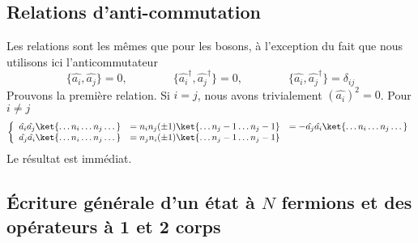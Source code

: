 \subsection{Relations d’anti-commutation}
Les relations sont les mêmes que pour les bosons, à l'exception du fait que nous utilisons ici 
l'anticommutateur
\begin{equation}
\{\hat{a_i},\hat{a_j}\}=0,\qquad\qquad \{\hat{a_i}^\dagger,\hat{a_j}^\dagger\}=0,\qquad\qquad
\{\hat{a_i},\hat{a_j}^\dagger\} = \delta_{ij}
\end{equation}
Prouvons la première relation. Si $i=j$, nous avons trivialement $(\hat{a_i})^2=0$. Pour $i\neq j$
\begin{equation}
\left\{\begin{array}{lll}
\hat{a_i}\hat{a_j}\ket{\dots n_i\dots n_j\dots} &= n_in_j(\pm 1)\ket{\dots n_j-1\dots n_j-1} &= 
-\hat{a_j}\hat{a_i}\ket{\dots n_i\dots n_j\dots}\\
\hat{a_j}\hat{a_i}\ket{\dots n_i\dots n_j\dots} &= n_jn_i(\pm 1)\ket{\dots n_j-1\dots n_j-1} 
\end{array}\right.
\end{equation}
Le résultat est immédiat.



\subsection{Écriture générale d'un état à $N$ fermions et des opérateurs à 1 et 2 corps}